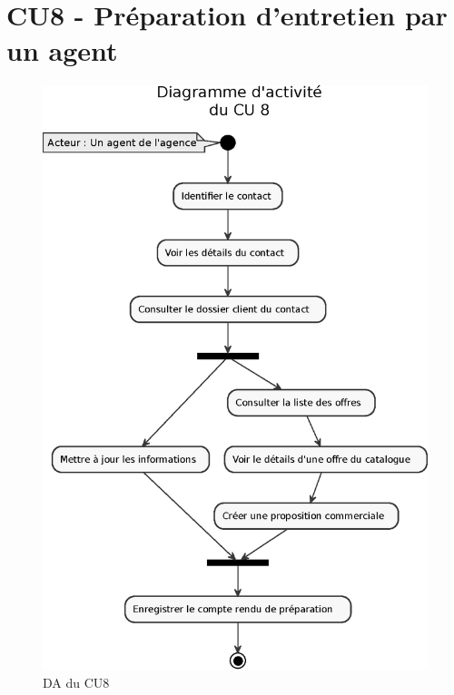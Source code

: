 \section{CU8 - Préparation d’entretien par un agent}
\begin{figure}[H]
\centering
\includegraphics[width=\textwidth]{figures/eps/DA_CU8.eps}
\caption{DA du CU8}
\end{figure}

